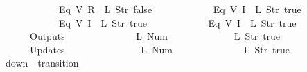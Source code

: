 \begin{isabellebody}
\ \ \ \ \ \ \ \ \ \ \ \ {\isacharparenleft}Eq\ {\isacharparenleft}V\ {\isacharparenleft}R\ {}{\isacharparenright}{\isacharparenright}\ {\isacharparenleft}L\ {\isacharparenleft}Str\ {\isacharprime}{\isacharprime}false{\isacharprime}{\isacharprime}{\isacharparenright}{\isacharparenright}{\isacharparenright}{\isacharcomma}\isanewline
\ \ \ \ \ \ \ \ \ \ \ \ {\isacharparenleft}Eq\ {\isacharparenleft}V\ {\isacharparenleft}I\ {}{\isacharparenright}{\isacharparenright}\ {\isacharparenleft}L\ {\isacharparenleft}Str\ {\isacharprime}{\isacharprime}true{\isacharprime}{\isacharprime}{\isacharparenright}{\isacharparenright}{\isacharparenright}{\isacharcomma}\isanewline
\ \ \ \ \ \ \ \ \ \ \ \ {\isacharparenleft}Eq\ {\isacharparenleft}V\ {\isacharparenleft}I\ {}{\isacharparenright}{\isacharparenright}\ {\isacharparenleft}L\ {\isacharparenleft}Str\ {\isacharprime}{\isacharprime}true{\isacharprime}{\isacharprime}{\isacharparenright}{\isacharparenright}{\isacharparenright}{\isacharcomma}\isanewline
\ \ \ \ \ \ \ \ \ \ \ \ {\isacharparenleft}Eq\ {\isacharparenleft}V\ {\isacharparenleft}I\ {}{\isacharparenright}{\isacharparenright}\ {\isacharparenleft}L\ {\isacharparenleft}Str\ {\isacharprime}{\isacharprime}true{\isacharprime}{\isacharprime}{\isacharparenright}{\isacharparenright}{\isacharparenright}\isanewline
\ \ \ \ \ \ {\isacharbrackright}{\isacharcomma}\isanewline
\ \ \ \ \ \ Outputs\ {\isacharequal}\ {\isacharbrackleft}\isanewline
\ \ \ \ \ \ \ \ \ \ \ \ {\isacharparenleft}L\ {\isacharparenleft}Num\ {}{\isacharparenright}{\isacharparenright}{\isacharcomma}\isanewline
\ \ \ \ \ \ \ \ \ \ \ \ {\isacharparenleft}L\ {\isacharparenleft}Str\ {\isacharprime}{\isacharprime}true{\isacharprime}{\isacharprime}{\isacharparenright}{\isacharparenright}\isanewline
\ \ \ \ \ \ {\isacharbrackright}{\isacharcomma}\isanewline
\ \ \ \ \ \ Updates\ {\isacharequal}\ {\isacharbrackleft}\isanewline
\ \ \ \ \ \ \ \ \ \ \ \ {\isacharparenleft}{}{\isacharcomma}\ {\isacharparenleft}L\ {\isacharparenleft}Num\ {}{\isacharparenright}{\isacharparenright}{\isacharparenright}{\isacharcomma}\isanewline
\ \ \ \ \ \ \ \ \ \ \ \ {\isacharparenleft}{}{\isacharcomma}\ {\isacharparenleft}L\ {\isacharparenleft}Str\ {\isacharprime}{\isacharprime}true{\isacharprime}{\isacharprime}{\isacharparenright}{\isacharparenright}{\isacharparenright}\isanewline
\ \ \ \ \ \ {\isacharbrackright}\isanewline
{\isasymrparr}{\isachardoublequoteclose}\isanewline
\isanewline
{}\isamarkupfalse%
\ {\isachardoublequoteopen}down{}{}{\isachardoublequoteclose}\ {\isacharcolon}{\isacharcolon}\ {\isachardoublequoteopen}transition{\isachardoublequoteclose}\ \isanewline

\end{isabellebody}
